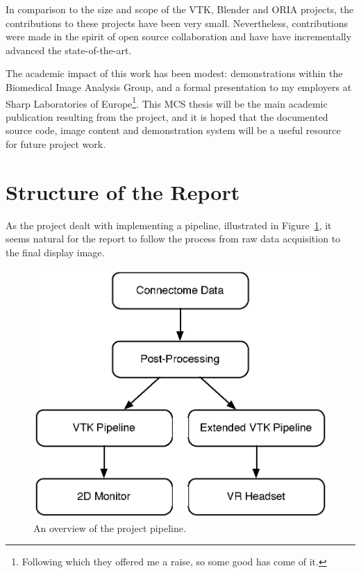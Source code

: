 \documentclass[MSc,paper=a4,pagesize=auto]{icldt}
\begin{document}
In comparison to the size and scope of the VTK, Blender and ORIA projects, the contributions to these projects have been very small. Nevertheless, contributions were made in the spirit of open source collaboration and have have incrementally advanced the state-of-the-art.

The academic impact of this work has been modest: demonstrations within the Biomedical Image Analysis Group, and a formal presentation to my employers at Sharp Laboratories of Europe\footnote{Following which they offered me a raise, so some good has come of it.}. This MCS thesis will be the main academic publication resulting from the project, and it is hoped that the documented source code, image content and demonstration system will be a useful resource for future project work.

\newpage
\section{Structure of the Report} 
\label{sec:structure_of_the_report}
As the project dealt with implementing a pipeline, illustrated in Figure~\ref{fig:the_full_pipeline}, it seems natural for the report to follow the process from raw data acquisition to the final display image. 

\begin{figure}[htbp!]
    \centering
    \includegraphics[scale=0.5]{resources/data_pipeline_overview}
    \caption{An overview of the project pipeline.}
    \label{fig:the_full_pipeline}
\end{figure}
\end{document}
